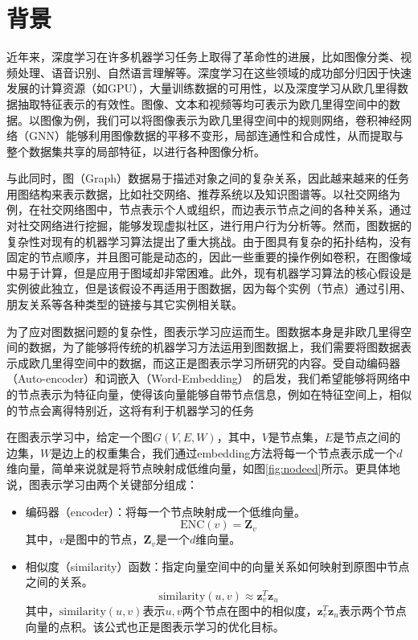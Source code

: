 \section{背景}\label{Intro}
近年来，深度学习在许多机器学习任务上取得了革命性的进展，比如图像分类、视频处理、语音识别、自然语言理解等。深度学习在这些领域的成功部分归因于快速发展的计算资源（如GPU），大量训练数据的可用性，以及深度学习从欧几里得数据抽取特征表示的有效性。图像、文本和视频等均可表示为欧几里得空间中的数据。以图像为例，我们可以将图像表示为欧几里得空间中的规则网络，卷积神经网络（GNN）\cite{NIPS2012_4824}能够利用图像数据的平移不变形，局部连通性和合成性，从而提取与整个数据集共享的局部特征，以进行各种图像分析。

与此同时，图（Graph）数据易于描述对象之间的复杂关系，因此越来越来的任务用图结构来表示数据，比如社交网络、推荐系统以及知识图谱等。以社交网络为例，在社交网络图中，节点表示个人或组织，而边表示节点之间的各种关系，通过对社交网络进行挖掘，能够发现虚拟社区，进行用户行为分析等。然而，图数据的复杂性对现有的机器学习算法提出了重大挑战。由于图具有复杂的拓扑结构，没有固定的节点顺序，并且图可能是动态的，因此一些重要的操作例如卷积，在图像域中易于计算，但是应用于图域却非常困难。此外，现有机器学习算法的核心假设是实例彼此独立，但是该假设不再适用于图数据，因为每个实例（节点）通过引用、朋友关系等各种类型的链接与其它实例相关联。

为了应对图数据问题的复杂性，图表示学习应运而生。图数据本身是非欧几里得空间的数据，为了能够将传统的机器学习方法运用到图数据上，我们需要将图数据表示成欧几里得空间中的数据，而这正是图表示学习所研究的内容。受自动编码器（Auto-encoder）\cite{hinton2006reducing}和词嵌入（Word-Embedding）\cite{mikolov2013distributed} 的启发，我们希望能够将网络中的节点表示为特征向量，使得该向量能够自带节点信息，例如在特征空间上，相似的节点会离得特别近，这将有利于机器学习的任务

在图表示学习中，给定一个图$G(V, E, W)$，其中，$V$是节点集，$E$是节点之间的边集，$W$是边上的权重集合，我们通过embedding方法将每一个节点表示成一个$d$维向量，简单来说就是将节点映射成低维向量，如图\ref{fig:nodeed}所示。更具体地说，图表示学习由两个关键部分组成：
\begin{itemize}
  \item 编码器（encoder）：将每一个节点映射成一个低维向量。
	\[\text{ENC}(v) = \textbf{Z}_v\]
	其中，$v$是图中的节点，$\textbf{Z}_v$是一个$d$维向量。
	\item 相似度（similarity）函数：指定向量空间中的向量关系如何映射到原图中节点之间的关系。
	  \[\text{similarity}(u, v) \approx \textbf{z}_v^T\textbf{z}_u\]
	  其中，$\text{similarity}(u, v)$表示$u, v$两个节点在图中的相似度，$\textbf{z}_v^T \textbf{z}_u$表示两个节点向量的点积。该公式也正是图表示学习的优化目标。
\end{itemize}

